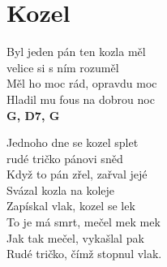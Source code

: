 \section{Kozel}
\onehalfspacing

Byl jeden pán ten kozla měl\\
velice si s ním rozuměl\\
Měl ho moc rád, opravdu moc\\
Hladil mu fous na dobrou noc \\
\textbf{G, D7, G}

\singlespacing

\sloka{}
Jednoho dne se kozel splet \\
rudé tričko pánovi sněd \\
Když to pán zřel, zařval jejé \\
Svázal kozla na koleje \\

\sloka{}
Zapískal vlak, kozel se lek \\
To je má smrt, mečel mek mek\\
Jak tak mečel, vykašlal pak\\
Rudé tričko, čímž stopnul vlak.\\


